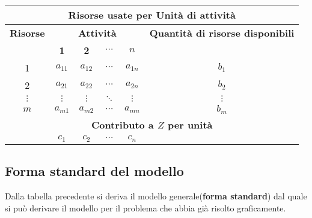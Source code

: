 \documentclass{article}
\begin{document}
    \begin{table}[ht]
      \centering
      \begin{tabular}{|c|c|c|c|c|c|}
        \hline
        \multicolumn{6}{|c|}{\textbf{Risorse usate per Unità di attività}} \\
        \hline
        \textbf{Risorse} & \multicolumn{4}{|c|}{\textbf{Attività}} & \textbf{Quantità di risorse disponibili} \\
        \cline{2-5}
         & \textbf{1} & \textbf{2} & \textbf{$\cdots$} & \textbf{$n$} &  \\
        \hline
        1 & $a_{11}$ & $a_{12}$ & $\cdots$ & $a_{1n}$ & $b_1$ \\
        2 & $a_{21}$ & $a_{22}$ & $\cdots$ & $a_{2n}$ & $b_2$ \\
        $\vdots$ & $\vdots$ & $\vdots$ & $\ddots$ & $\vdots$ & $\vdots$ \\
        $m$ & $a_{m1}$ & $a_{m2}$ & $\cdots$ & $a_{mn}$ & $b_m$ \\
        \hline
        \multicolumn{6}{|c|}{\textbf{Contributo a $Z$ per unità}} \\
        \hline
        \multicolumn{1}{|c|}{} & $c_1$ & $c_2$ & $\cdots$ & $c_n$ & \\
        \hline
      \end{tabular}
    \end{table} 

    \subsection{Forma standard del modello}
      Dalla tabella precedente si deriva il modello generale(\textbf{forma standard}) dal quale si può derivare il modello per il problema che abbia già risolto graficamente.\\
      
\end{document}
